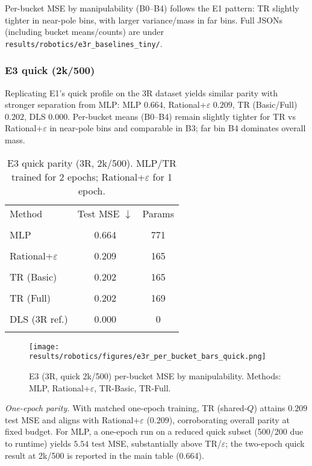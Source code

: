 \documentclass[11pt,twoside]{article}
\begin{document}
Per-bucket MSE by manipulability (B0--B4) follows the E1 pattern: TR slightly tighter in near-pole bins, with larger variance/mass in far bins. Full JSONs (including bucket means/counts) are under \verb|results/robotics/e3r_baselines_tiny/|.

\subsubsection{E3 quick (2k/500)}

Replicating E1's quick profile on the 3R dataset yields similar parity with stronger separation from MLP: MLP $0.664$, Rational+$\varepsilon$ $0.209$, TR (Basic/Full) $0.202$, DLS $0.000$. Per-bucket means (B0--B4) remain slightly tighter for TR vs Rational+$\varepsilon$ in near-pole bins and comparable in B3; far bin B4 dominates overall mass.

\begin{table}[h]
  \centering
  \small
  \begin{tabular}{lcc}
    \toprule
    Method & Test MSE $\downarrow$ & Params \\\\
    \midrule
    MLP & 0.664 & 771 \\\\
    Rational+$\varepsilon$ & 0.209 & 165 \\\\
    TR (Basic) & 0.202 & 165 \\\\
    TR (Full) & 0.202 & 169 \\\\
    DLS (3R ref.) & 0.000 & 0 \\\\
    \bottomrule
  \end{tabular}
  \caption{E3 quick parity (3R, 2k/500). MLP/TR trained for 2 epochs; Rational+$\varepsilon$ for 1 epoch.}
\end{table}

\begin{figure}[h]
  \centering
  \texttt{[image: results/robotics/figures/e3r\_per\_bucket\_bars\_quick.png]}
  \caption{E3 (3R, quick 2k/500) per-bucket MSE by manipulability. Methods: MLP, Rational+$\varepsilon$, TR-Basic, TR-Full.}
\end{figure}

\noindent\textit{One-epoch parity.} With matched one-epoch training, TR (shared-$Q$) attains $0.209$ test MSE and aligns with Rational+$\varepsilon$ ($0.209$), corroborating overall parity at fixed budget. For MLP, a one-epoch run on a reduced quick subset (500/200 due to runtime) yields $5.54$ test MSE, substantially above TR/$\varepsilon$; the two-epoch quick result at 2k/500 is reported in the main table (0.664).
\end{document}
